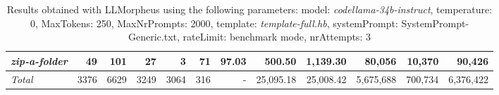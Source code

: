 \begin{table*}
{\begin{tabular}{l||r|r|r|r|r|r||r|r||r|r|r}
   \hline
   \textit{zip-a-folder} & 49 & 101 & 27 & 3 & 71 & 97.03 & 500.50 & 1,139.30 & 80,056 & 10,370 & 90,426 \\ 
   \hline
   \textit{Total} & 3376 & 6629 & 3249 & 3064 & 316 & - & 25,095.18  & 25,008.42 & 5,675,688 & 700,734 & 6,376,422 \\ 
 \end{tabular}
 }
 \caption{Results obtained with LLMorpheus using the following parameters: 
   model: \textit{codellama-34b-instruct}, 
   temperature: 0, 
   MaxTokens: 250, 
   MaxNrPrompts: 2000, 
   template: \textit{template-full.hb}, 
   systemPrompt: SystemPrompt-Generic.txt, 
   rateLimit: benchmark mode, 
   nrAttempts: 3  
 }
\end{table*}

